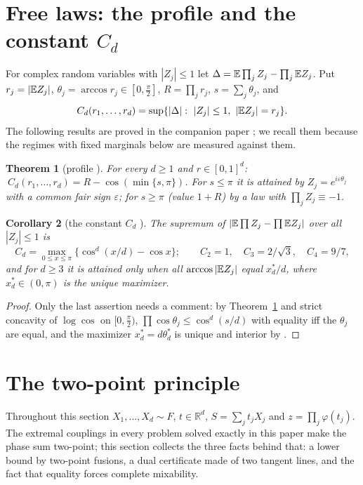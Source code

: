 \documentclass[11pt]{amsart}
\newtheorem{theorem}{Theorem}[section]\newtheorem{proposition}[theorem]{Proposition}\newtheorem{lemma}[theorem]{Lemma}
\newtheorem{corollary}[theorem]{Corollary}\newtheorem{conjecture}[theorem]{Conjecture}
\theoremstyle{definition}\newtheorem{definition}[theorem]{Definition}\theoremstyle{remark}\newtheorem{remark}[theorem]{Remark}
\begin{document}
\section{Free laws: the profile and the constant $C_d$}\label{sec:free}
For complex random variables with $|Z_j|\le1$ let $\Delta=\mathbb E\prod_jZ_j-\prod_j\mathbb E Z_j$. Put $r_j=|\mathbb E Z_j|$, $\theta_j=\arccos r_j\in[0,\frac\pi2]$, $R=\prod_jr_j$, $s=\sum_j\theta_j$, and
\[C_d(r_1,\dots,r_d)=\sup\{|\Delta|:\ |Z_j|\le1,\ |\E Z_j|=r_j\}.\]
The following results are proved in the companion paper \cite{I}; we recall them because the regimes with fixed marginals below are measured against them.
\begin{theorem}[profile {\cite[Thm~2.1]{I}}]\label{thm:profile}
For every $d\ge1$ and $r\in[0,1]^d$: $\ C_d(r_1,\dots,r_d)=R-\cos(\min\{s,\pi\})$. For $s\le\pi$ it is attained by $Z_j=e^{i\varepsilon\theta_j}$ with a common fair sign
$\varepsilon$; for $s\ge\pi$ (value $1+R$) by a law with $\prod_jZ_j\equiv-1$.
\end{theorem}
\begin{corollary}[the constant $C_d$ {\cite[Cor.~2.2, Thm~2.4]{I}}]\label{cor:Cd}
The supremum of $|\mathbb E\prod Z_j-\prod\mathbb E Z_j|$ over all $|Z_j|\le1$ is
\[C_d=\max_{0\le x\le\pi}\{\cos^d(x/d)-\cos x\};\qquad C_2=1,\quad C_3=2/\sqrt3,\quad C_4=9/7,\]
and for $d\ge3$ it is attained only when all $\arccos|\mathbb E Z_j|$ equal $x^*_d/d$, where $x^*_d\in(0,\pi)$ is the unique maximizer.
\end{corollary}
\begin{proof}Only the last assertion needs a comment: by Theorem~\ref{thm:profile} and strict concavity of $\log\cos$ on $[0,\frac\pi2)$, $\prod\cos\theta_j\le\cos^d(s/d)$ with
equality iff the $\theta_j$ are equal, and the maximizer $x^*_d=d\theta^*_d$ is unique and interior by \cite[Thm~2.4]{I}.\end{proof}

\section{The two-point principle}\label{sec:twopoint}
Throughout this section $X_1,\dots,X_d\sim F$, $t\in\mathbb R^d$, $S=\sum_jt_jX_j$ and $z=\prod_j\varphi(t_j)$. The extremal couplings in every problem solved exactly in this paper
make the phase sum two-point; this section collects the three facts behind that: a lower bound by two-point fusions, a dual certificate made of two
tangent lines, and the fact that equality forces complete mixability.
\end{document}
